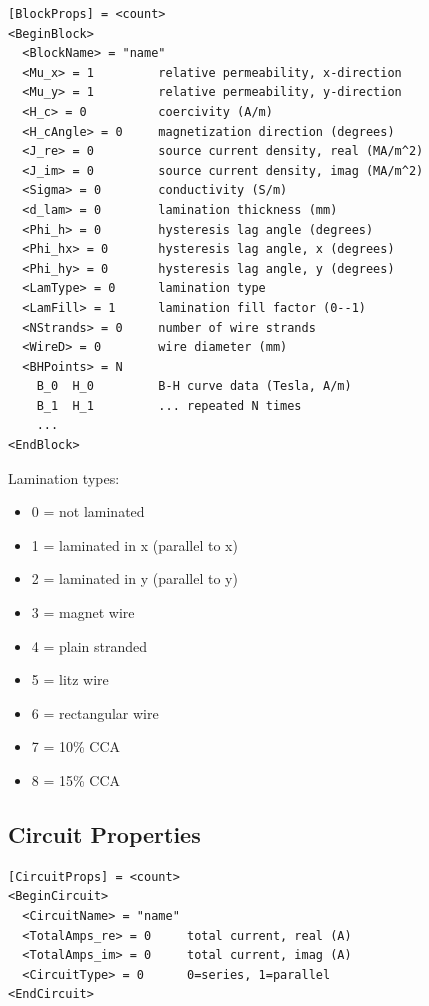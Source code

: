 \documentclass[11pt]{article}
\begin{document}
\begin{lstlisting}
[BlockProps] = <count>
<BeginBlock>
  <BlockName> = "name"
  <Mu_x> = 1         relative permeability, x-direction
  <Mu_y> = 1         relative permeability, y-direction
  <H_c> = 0          coercivity (A/m)
  <H_cAngle> = 0     magnetization direction (degrees)
  <J_re> = 0         source current density, real (MA/m^2)
  <J_im> = 0         source current density, imag (MA/m^2)
  <Sigma> = 0        conductivity (S/m)
  <d_lam> = 0        lamination thickness (mm)
  <Phi_h> = 0        hysteresis lag angle (degrees)
  <Phi_hx> = 0       hysteresis lag angle, x (degrees)
  <Phi_hy> = 0       hysteresis lag angle, y (degrees)
  <LamType> = 0      lamination type
  <LamFill> = 1      lamination fill factor (0--1)
  <NStrands> = 0     number of wire strands
  <WireD> = 0        wire diameter (mm)
  <BHPoints> = N
    B_0  H_0         B-H curve data (Tesla, A/m)
    B_1  H_1         ... repeated N times
    ...
<EndBlock>
\end{lstlisting}

Lamination types:
\begin{itemize}[nosep]
  \item 0 = not laminated
  \item 1 = laminated in x (parallel to x)
  \item 2 = laminated in y (parallel to y)
  \item 3 = magnet wire
  \item 4 = plain stranded
  \item 5 = litz wire
  \item 6 = rectangular wire
  \item 7 = 10\% CCA
  \item 8 = 15\% CCA
\end{itemize}

\subsection{Circuit Properties}

\begin{lstlisting}
[CircuitProps] = <count>
<BeginCircuit>
  <CircuitName> = "name"
  <TotalAmps_re> = 0     total current, real (A)
  <TotalAmps_im> = 0     total current, imag (A)
  <CircuitType> = 0      0=series, 1=parallel
<EndCircuit>
\end{lstlisting}

\end{document}

